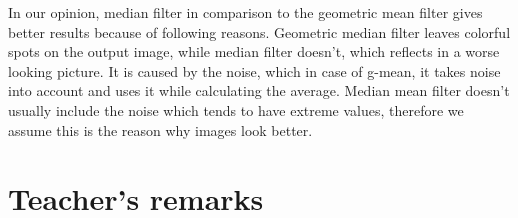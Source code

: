 \documentclass[12pt]{article}
\theoremstyle{definition}
\begin{document}
In our opinion, median filter in comparison to the geometric mean filter gives better results because of following reasons. Geometric median filter leaves colorful spots on the output image, while median filter doesn’t, which reflects in a worse looking picture. It is caused by the noise, which in case of g-mean, it takes noise into account and uses it while calculating the average. Median mean filter doesn’t usually include the noise which tends to have extreme values, therefore we assume this is the reason why images look better.

\vfill
\section*{Teacher's remarks}
\begin{tabularx}{\textwidth}{|X|}
    \hline
    \vspace{7cm}
    \phantom{.} \\
    \hline
\end{tabularx}
\end{document}
